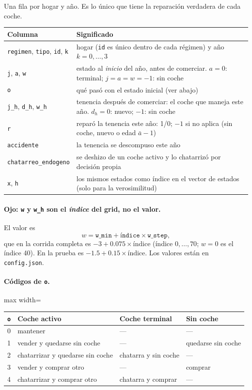 \documentclass[11pt]{article}
\newcommand{\col}[1]{\texttt{#1}}
\begin{document}
Una fila por hogar y año. Es lo único que tiene la reparación verdadera de cada coche.

\begin{center}\small
\begin{longtable}{p{3.6cm}p{11.2cm}}
\toprule
Columna & Significado\\
\midrule
\col{regimen}, \col{tipo}, \col{id}, \col{k} & hogar (\col{id} es único dentro de cada régimen) y año $k=0,\dots,3$\\
\col{j}, \col{a}, \col{w} & estado al \emph{inicio} del año, antes de comerciar. $a=0$: terminal; $j=a=w=-1$: sin coche\\
\col{o} & qué pasó con el estado inicial (ver abajo)\\
\col{j\_h}, \col{d\_h}, \col{w\_h} & tenencia después de comerciar: el coche que maneja este año. $d_h=0$: nuevo; $-1$: sin coche\\
\col{r} & reparó la tenencia este año: 1/0; $-1$ si no aplica (sin coche, nuevo o edad $\bar a-1$)\\
\col{accidente} & la tenencia se descompuso este año\\
\col{chatarreo\_endogeno} & se deshizo de un coche activo y lo chatarrizó por decisión propia\\
\col{x}, \col{h} & los mismos estados como índice en el vector de estados (solo para la verosimilitud)\\
\bottomrule
\end{longtable}
\end{center}

\paragraph{Ojo: \col{w} y \col{w\_h} son el \emph{índice} del grid, no el valor.} El valor es
\[
w = \texttt{w\_min} + \texttt{índice}\times\texttt{w\_step},
\]
que en la corrida completa es $-3+0.075\times\text{índice}$ (índice $0,\dots,70$; $w=0$ es el
índice 40). En la prueba es $-1.5+0.15\times\text{índice}$. Los valores están en
\texttt{config.json}.

\paragraph{Códigos de \col{o}.}
\begin{center}\small
\begin{adjustbox}{max width=\textwidth}\begin{tabular}{clll}
\toprule
\col{o} & Coche activo & Coche terminal & Sin coche\\
\midrule
0 & mantener & --- & ---\\
1 & vender y quedarse sin coche & --- & quedarse sin coche\\
2 & chatarrizar y quedarse sin coche & chatarra y sin coche & ---\\
3 & vender y comprar otro & --- & comprar\\
4 & chatarrizar y comprar otro & chatarra y comprar & ---\\
\bottomrule
\end{tabular}\end{adjustbox}
\end{center}
\end{document}

